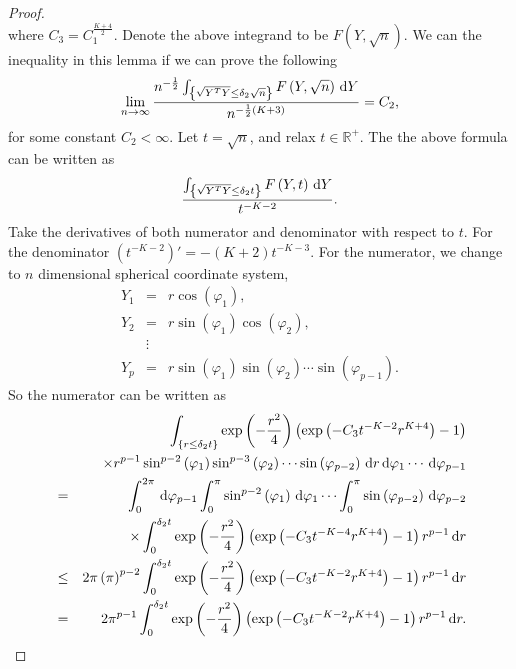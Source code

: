 \begin{proof}
\[\]
where $C_{3}=C_{1}^{\frac{K+4}{2}}$. Denote the above integrand to
be $F\left(Y,\sqrt{n}\right)$. We can the inequality in this lemma
if we can prove the following 
\begin{equation}
\lim_{n\rightarrow\infty}\frac{n^{-\frac{1}{2}}\int_{\left\{ \sqrt{Y^{T}Y}\le\delta_{2}\sqrt{n}\right\} }F\left(Y,\sqrt{n}\right)\,\mathrm{d} Y}{n^{-\frac{1}{2}\left(K+3\right)}}=C_{2},\label{eq:lim-rhs-vs-lfs-inequality}
\end{equation}
for some constant $C_{2}<\infty$. Let $t=\sqrt{n}$, and relax $t\in\mathbb{R}^{+}$.
The the above formula can be written as 
\[
\frac{\int_{\left\{ \sqrt{Y^{T}Y}\le\delta_{2}t\right\} }F\left(Y,t\right)\,\mathrm{d} Y}{t^{-K-2}}.
\]
Take the derivatives of both numerator and denominator with respect
to $t$. For the denominator $\left(t^{-K-2}\right)'=-\left(K+2\right)t^{-K-3}.$
For the numerator, we change to $n$ dimensional spherical coordinate
system, 
\begin{eqnarray*}
Y_{1} & = & r\cos\left(\varphi_{1}\right),\\
Y_{2} & = & r\sin\left(\varphi_{1}\right)\cos\left(\varphi_{2}\right),\\
 & \vdots\\
Y_{p} & = & r\sin\left(\varphi_{1}\right)\sin\left(\varphi_{2}\right)\cdots\sin\left(\varphi_{p-1}\right).
\end{eqnarray*}
So the numerator can be written as 
\begin{eqnarray*}
 &  & \int_{\left\{ r\le\delta_{2}t\right\} }\exp\left(-\frac{r^{2}}{4}\right)\left(\exp\left(-C_{3}t^{-K-2}r^{K+4}\right)-1\right)\\
 &  & \times r^{p-1}\sin^{p-2}\left(\varphi_{1}\right)\sin^{p-3}\left(\varphi_{2}\right)\cdots\sin\left(\varphi_{p-2}\right)\,\mathrm{d} r\,\mathrm{d}\varphi_{1}\cdots\,\mathrm{d}\varphi_{p-1}\\
 & = & \int_{0}^{2\pi}\,\mathrm{d}\varphi_{p-1}\int_{0}^{\pi}\sin^{p-2}\left(\varphi_{1}\right)\,\mathrm{d}\varphi_{1}\cdots\int_{0}^{\pi}\sin\left(\varphi_{p-2}\right)\,\mathrm{d}\varphi_{p-2}\\
 &  & \times\int_{0}^{\delta_{2}t}\exp\left(-\frac{r^{2}}{4}\right)\left(\exp\left(-C_{3}t^{-K-4}r^{K+4}\right)-1\right)r^{p-1}\,\mathrm{d} r\\
 & \le & 2\pi\left(\pi\right)^{p-2}\int_{0}^{\delta_{2}t}\exp\left(-\frac{r^{2}}{4}\right)\left(\exp\left(-C_{3}t^{-K-2}r^{K+4}\right)-1\right)r^{p-1}\,\mathrm{d} r\\
 & = & 2\pi^{p-1}\int_{0}^{\delta_{2}t}\exp\left(-\frac{r^{2}}{4}\right)\left(\exp\left(-C_{3}t^{-K-2}r^{K+4}\right)-1\right)r^{p-1}\,\mathrm{d} r.
\end{eqnarray*}
 

\end{proof}
